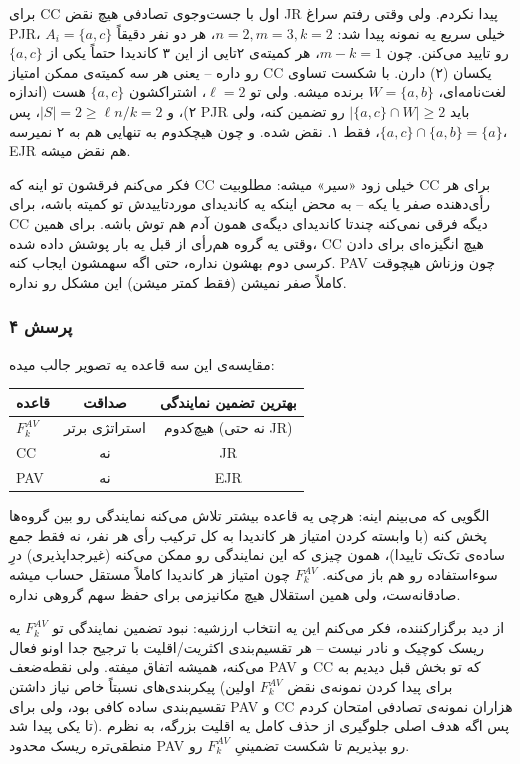 \documentclass[12pt, a4paper]{article}
\begin{document}
برای CC اول با جست‌وجوی تصادفی هیچ نقض JR پیدا نکردم. ولی وقتی رفتم سراغ PJR، خیلی سریع یه نمونه پیدا شد: $n=2, m=3, k=2$، هر دو نفر دقیقاً $A_i=\{a,c\}$ رو تایید می‌کنن. چون $m-k=1$، هر کمیته‌ی ۲تایی از این ۳ کاندیدا حتماً یکی از $\{a,c\}$ رو داره -- یعنی هر سه کمیته‌ی ممکن امتیاز CC یکسان (۲) دارن. با شکست تساوی لغت‌نامه‌ای، $W=\{a,b\}$ برنده میشه. ولی تو $\ell=2$، اشتراکشون $\{a,c\}$ هست (اندازه ۲)، و $|S|=2\ge\ell n/k=2$، پس PJR باید $|\{a,c\}\cap W|\ge2$ رو تضمین کنه، ولی $\{a,c\}\cap\{a,b\}=\{a\}$، فقط ۱. نقض شده. و چون هیچکدوم به تنهایی هم به ۲ نمیرسه، EJR هم نقض میشه.

فکر می‌کنم فرقشون تو اینه که CC خیلی زود «سیر» میشه: مطلوبیت CC برای هر رأی‌دهنده صفر یا یکه -- به محض اینکه یه کاندیدای موردتاییدش تو کمیته باشه، برای CC دیگه فرقی نمی‌کنه چندتا کاندیدای دیگه‌ی همون آدم هم توش باشه. برای همین وقتی یه گروه هم‌رأی از قبل یه بار پوشش داده شده، CC هیچ انگیزه‌ای برای دادن کرسی دوم بهشون نداره، حتی اگه سهمشون ایجاب کنه. PAV چون وزناش هیچوقت کاملاً صفر نمیشن (فقط کمتر میشن) این مشکل رو نداره.

\subsubsection*{پرسش ۴}

مقایسه‌ی این سه قاعده یه تصویر جالب میده:

\begin{center}
\begin{tabular}{l|c|c}
قاعده & صداقت & بهترین تضمین نمایندگی \\
\hline
$F_k^{AV}$ & استراتژی برتر & هیچ‌کدوم (نه حتی JR) \\
CC & نه & JR \\
PAV & نه & EJR
\end{tabular}
\end{center}

الگویی که می‌بینم اینه: هرچی یه قاعده بیشتر تلاش می‌کنه نمایندگی رو بین گروه‌ها پخش کنه (با وابسته کردن امتیاز هر کاندیدا به کل ترکیب رأی هر نفر، نه فقط جمع ساده‌ی تک‌تک تاییدا)، همون چیزی که این نمایندگی رو ممکن می‌کنه (غیرجداپذیری) درِ سوءاستفاده رو هم باز می‌کنه. $F_k^{AV}$ چون امتیاز هر کاندیدا کاملاً مستقل حساب میشه صادقانه‌ست، ولی همین استقلال هیچ مکانیزمی برای حفظ سهم گروهی نداره.

از دید برگزارکننده، فکر می‌کنم این یه انتخاب ارزشیه: نبود تضمین نمایندگی تو $F_k^{AV}$ یه ریسک کوچیک و نادر نیست -- هر تقسیم‌بندی اکثریت/اقلیت با ترجیح جدا اونو فعال می‌کنه، همیشه اتفاق میفته. ولی نقطه‌ضعف PAV و CC که تو بخش قبل دیدیم به پیکربندی‌های نسبتاً خاص نیاز داشتن (برای پیدا کردن نمونه‌ی نقض $F_k^{AV}$ اولین تقسیم‌بندی ساده کافی بود، ولی برای PAV و CC هزاران نمونه‌ی تصادفی امتحان کردم تا یکی پیدا شد). پس اگه هدف اصلی جلوگیری از حذف کامل یه اقلیت بزرگه، به نظرم منطقی‌تره ریسک محدود PAV رو بپذیریم تا شکست تضمینیِ $F_k^{AV}$ رو.
\end{document}
